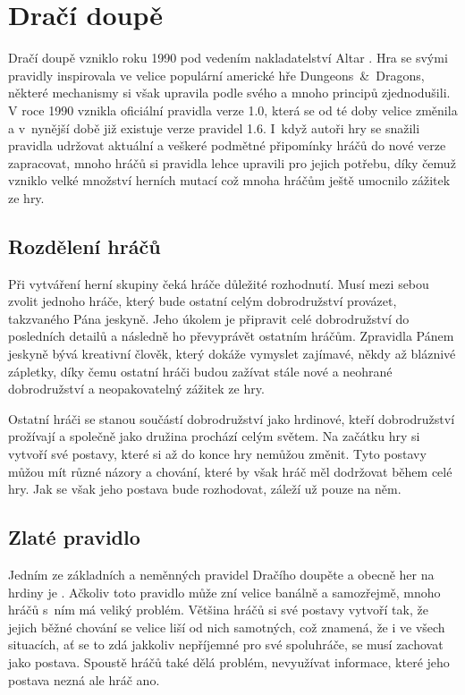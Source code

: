 \documentclass[thesis=B,czech]{resources/FITthesis}[2012/06/26]
\begin{document}
	\section{Dračí doupě}
	Dračí doupě vzniklo roku 1990 pod vedením nakladatelství Altar \cite{altar}. Hra se svými pravidly inspirovala ve velice populární americké hře Dungeons~\&~Dragons, některé mechanismy si však upravila podle svého a mnoho principů zjednodušili. V roce 1990 vznikla oficiální pravidla verze 1.0, která se od té doby velice změnila a v~nynější době již existuje verze pravidel 1.6. I~když autoři hry se snažili pravidla udržovat aktuální a veškeré podmětné připomínky hráčů do nové verze zapracovat, mnoho hráčů si pravidla lehce upravili pro jejich potřebu, díky čemuž vzniklo velké množství herních mutací což mnoha hráčům ještě umocnilo zážitek ze hry. 
	
	\subsection{Rozdělení hráčů}
Při vytváření herní skupiny čeká hráče důležité rozhodnutí. Musí mezi sebou zvolit jednoho hráče, který bude ostatní celým dobrodružství provázet, takzvaného Pána jeskyně. Jeho úkolem je připravit celé dobrodružství do posledních detailů a následně ho převyprávět ostatním hráčům. Zpravidla Pánem jeskyně bývá kreativní člověk, který dokáže vymyslet zajímavé, někdy až bláznivé zápletky, díky čemu ostatní hráči budou zažívat stále nové a neohrané dobrodružství a neopakovatelný zážitek ze hry. \par

Ostatní hráči se stanou součástí dobrodružství jako hrdinové, kteří dobrodružství prožívají a společně jako družina prochází celým světem. Na začátku hry si vytvoří své postavy, které si až do konce hry nemůžou změnit. Tyto postavy můžou mít různé názory a chování, které by však hráč měl dodržovat během celé hry. Jak se však jeho postava bude rozhodovat, záleží už pouze na něm.


	\subsection{Zlaté pravidlo}
Jedním ze základních a neměnných pravidel Dračího doupěte a obecně her na hrdiny je . Ačkoliv toto pravidlo může zní velice banálně a samozřejmě, mnoho hráčů s~ním má veliký problém. Většina hráčů si své postavy vytvoří tak, že jejich běžné chování se velice liší od nich samotných, což znamená, že i ve všech situacích, ať se to zdá jakkoliv nepříjemné pro své spoluhráče, se musí zachovat jako postava. Spoustě hráčů také dělá problém, nevyužívat informace, které jeho postava nezná ale hráč ano. \par
\end{document}

